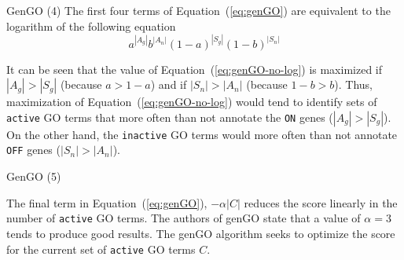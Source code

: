 \documentclass{beamer}
\begin{document}
\begin{frame}{GenGO (4)}
 The first four terms of Equation~(\ref{eq:genGO}) are equivalent to the
logarithm of the following equation
\begin{equation}
a^{|A_g|}b^{|A_n|}(1-a)^{|S_g|}(1-b)^{|S_n|}
\label{eq:genGO-no-log}
\end{equation}

It can be seen that the value of Equation~(\ref{eq:genGO-no-log}) is
maximized if $|A_g|>|S_g|$ (because  $a>1-a$) and if $|S_n|>|A_n|$
(because $1-b>b$). Thus, maximization of
Equation~(\ref{eq:genGO-no-log}) would tend to identify sets of
\texttt{active} GO terms
that more often than not annotate the \texttt{ON} genes
($|A_g|>|S_g|$). On the other hand, the \texttt{inactive} GO terms
would more often than not annotate \texttt{OFF} genes
($|S_n|>|A_n|$).
\end{frame}
\begin{frame}{GenGO (5)}
 
 The final term in Equation~(\ref{eq:genGO}), $- \alpha |C|$ reduces the
score linearly in the number of \texttt{active} GO terms. The authors
of genGO state that a value of $\alpha=3$ tends to produce good
results. The genGO algorithm seeks to optimize the score for the
current set of \texttt{active} GO terms $C$. 
 
\end{frame}
\end{document}
